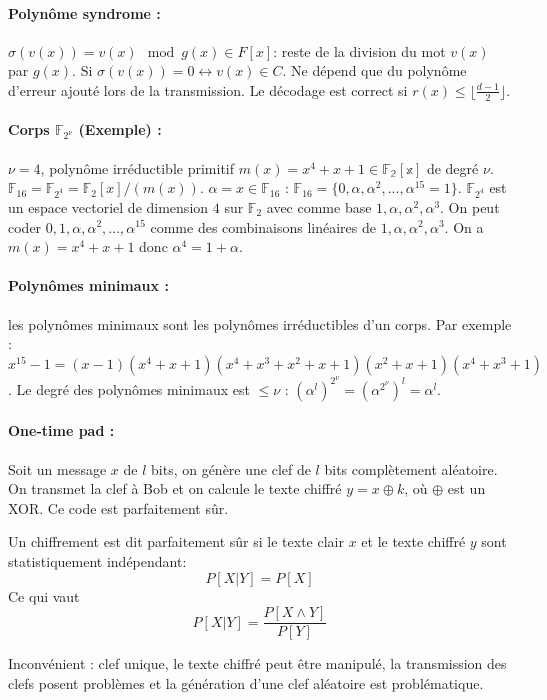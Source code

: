 \documentclass[11pt,a4paper]{report}
\newcommand{\f}{\mathbb{F}}
\begin{document}
\paragraph*{Polynôme syndrome :} $\sigma(v(x))=v(x)\mod g(x) \in F[x]$: reste de la division du mot $v(x)$ par $g(x)$. Si $\sigma(v(x))=0 \leftrightarrow v(x)\in C$. Ne dépend que du polynôme d'erreur ajouté lors de la transmission. Le décodage est correct si $r(x) \leq \lfloor\frac{d-1}{2}\rfloor$.

\paragraph*{Corps $\mathbb{F}_{2^\nu}$ (Exemple) :} $\nu=4$, polynôme irréductible primitif $m(x)=x^4+x+1\in \mathbb{F_2[x]}$ de degré $\nu$. $\f_{16}=\f_{2^4}=\f_2[x]/(m(x))$. $\alpha = x \in \f_{16}$ : $\f_{16} = \{0,\alpha,\alpha^2,...,\alpha^{15}=1\}$. $\f_{2^4}$ est un espace vectoriel de dimension $4$ sur $\f_2$ avec comme base $1,\alpha,\alpha^2,\alpha^3$. On peut coder $0,1,\alpha,\alpha^2,...,\alpha^{15}$ comme des combinaisons linéaires de $1,\alpha,\alpha^2,\alpha^3$. On a $m(x)=x^4+x+1$ donc $\alpha^4=1+\alpha$.

\paragraph*{Polynômes minimaux :} les polynômes minimaux sont les polynômes irréductibles d'un corps. Par exemple : $x^15-1 = (x-1)(x^4+x+1)(x^4+x^3+x^2+x+1)(x^2+x+1)(x^4+x^3+1)$. Le degré des polynômes minimaux est $\leq \nu$ : $(\alpha^l)^{2^\nu} = (\alpha^{2^\nu})^l=\alpha^l$.

\paragraph*{One-time pad :}

Soit un message $x$ de $l$ bits, on génère une clef de $l$ bits complètement aléatoire. On transmet la clef à Bob et on calcule le texte chiffré $y=x\oplus k$, où $\oplus$ est un XOR. Ce code est parfaitement sûr.

Un chiffrement est dit parfaitement sûr si le texte clair $x$ et le texte chiffré $y$ sont statistiquement indépendant:
$$ P[X|Y] = P[X] $$
Ce qui vaut
$$ P[X|Y] = \frac{P[X \wedge Y]}{P[Y]} $$

Inconvénient : clef unique, le texte chiffré peut être manipulé, la transmission des clefs posent problèmes et la génération d'une clef aléatoire est problématique.
\end{document}
